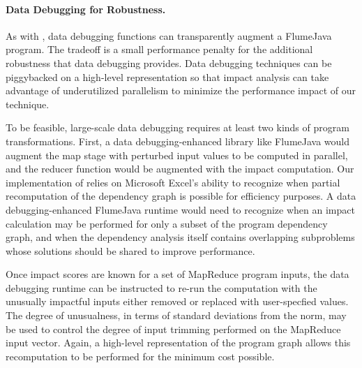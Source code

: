 \paragraph{Data Debugging for Robustness.}
As with \checkcell{}, data debugging functions can transparently
augment a FlumeJava program.  The tradeoff is a small performance
penalty for the additional robustness that data debugging provides. Data
debugging techniques can be piggybacked on a high-level representation
so that impact analysis can take advantage of underutilized
parallelism to minimize the performance impact of our technique.

To be feasible, large-scale data debugging requires at least two kinds
of program transformations.  First, a data debugging-enhanced library
like FlumeJava would augment the map stage with perturbed input values
to be computed in parallel, and the reducer function would be
augmented with the impact computation.  Our implementation of
\checkcell{} relies on Microsoft Excel's ability to recognize when
partial recomputation of the dependency graph is possible for
efficiency purposes. A data debugging-enhanced FlumeJava runtime would
need to recognize when an impact calculation may be performed for
only a subset of the program dependency graph, and when the dependency
analysis itself contains overlapping subproblems whose solutions
should be shared to improve performance.

Once impact scores are known for a set of MapReduce program inputs,
the data debugging runtime can be instructed to re-run the computation
with the unusually impactful inputs either removed or replaced with
user-specfied values.  The degree of unusualness, in terms of standard
deviations from the norm, may be used to control the degree of
input trimming performed on the MapReduce input vector.  Again,
a high-level representation of the program graph allows this
recomputation to be performed for the minimum cost possible.
